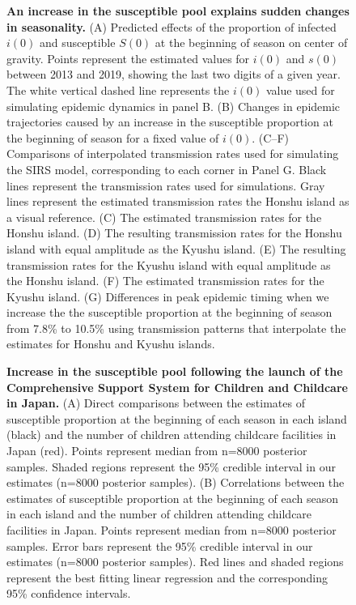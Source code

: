 \documentclass[12pt]{article}
\begin{document}
\begin{figure}[!th]
\begin{center}
\caption{
\textbf{An increase in the susceptible pool explains sudden changes in seasonality.}
(A) Predicted effects of the proportion of infected $i(0)$ and susceptible $S(0)$ at the beginning of season on center of gravity.
Points represent the estimated values for $i(0)$ and $s(0)$ between 2013 and 2019, showing the last two digits of a given year.
The white vertical dashed line represents the $i(0)$ value used for simulating epidemic dynamics in panel B.
(B) Changes in epidemic trajectories caused by an increase in the susceptible proportion at the beginning of season for a fixed value of $i(0)$.
(C--F) Comparisons of interpolated transmission rates used for simulating the SIRS model, corresponding to each corner in Panel G. 
Black lines represent the transmission rates used for simulations. 
Gray lines represent the estimated transmission rates the Honshu island as a visual reference.
(C) The estimated transmission rates for the Honshu island.
(D) The resulting transmission rates for the Honshu island with equal amplitude as the Kyushu island.
(E) The resulting transmission rates for the Kyushu island with equal amplitude as the Honshu island.
(F) The estimated transmission rates for the Kyushu island.
(G) Differences in peak epidemic timing when we increase the the susceptible proportion at the beginning of season from 7.8\% to 10.5\% using transmission patterns that interpolate the estimates for Honshu and Kyushu islands. 
}
\label{fig:fig3}
\end{center}
\end{figure}

\begin{figure}[!th]
\caption{
\textbf{Increase in the susceptible pool following the launch of the Comprehensive Support System for Children and Childcare in Japan.}
(A) Direct comparisons between the estimates of susceptible proportion at the beginning of each season in each island (black) and the number of children attending childcare facilities in Japan (red).
Points represent median from n=8000 posterior samples.
Shaded regions represent the 95\% credible interval in our estimates (n=8000 posterior samples).
(B) Correlations between the estimates of susceptible proportion at the beginning of each season in each island and the number of children attending childcare facilities in Japan.
Points represent median from n=8000 posterior samples.
Error bars represent the 95\% credible interval in our estimates (n=8000 posterior samples).
Red lines and shaded regions represent the best fitting linear regression and the corresponding 95\% confidence intervals.
}
\label{fig:fig4}
\end{figure}
\end{document}
